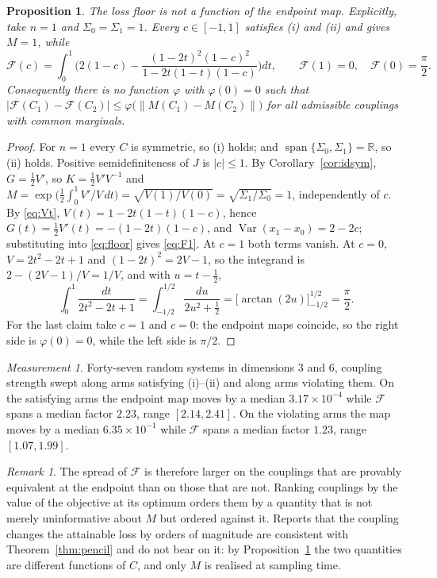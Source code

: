 \documentclass[11pt]{article}
\newtheorem{proposition}[lemma]{Proposition}
\theoremstyle{definition}
\theoremstyle{remark}
\newtheorem{remark}[lemma]{Remark}
\newtheorem{measurement}[lemma]{Measurement}
\DeclareMathOperator{\Var}{Var}
\DeclareMathOperator{\spn}{span}
\newcommand{\R}{\mathbb{R}}
\begin{document}
\begin{proposition}\label{prop:decouple}
The loss floor is not a function of the endpoint map. Explicitly, take $n=1$ and
$\Sigma_0=\Sigma_1=1$. Every $c\in[-1,1]$ satisfies \textup{(i)} and \textup{(ii)} and gives
$M=1$, while
\begin{equation}\label{eq:F1}
\mathcal F(c)=\int_0^1\Big(2(1-c)-\frac{(1-2t)^{2}(1-c)^{2}}{1-2t(1-t)(1-c)}\Big)dt,
\qquad
\mathcal F(1)=0,\quad \mathcal F(0)=\frac{\pi}{2}.
\end{equation}
Consequently there is no function $\varphi$ with $\varphi(0)=0$ such that
$|\mathcal F(C_1)-\mathcal F(C_2)|\le\varphi\big(\|M(C_1)-M(C_2)\|\big)$ for all admissible
couplings with common marginals.
\end{proposition}

\begin{proof}
For $n=1$ every $C$ is symmetric, so (i) holds; and $\spn\{\Sigma_0,\Sigma_1\}=\R$, so (ii)
holds. Positive semidefiniteness of $J$ is $|c|\le1$. By Corollary~\ref{cor:idsym},
$G=\tfrac12V'$, so $K=\tfrac12V'V^{-1}$ and
$M=\exp\big(\tfrac12\int_0^1V'/V\,dt\big)=\sqrt{V(1)/V(0)}=\sqrt{\Sigma_1/\Sigma_0}=1$,
independently of $c$. By \eqref{eq:Vt}, $V(t)=1-2t(1-t)(1-c)$, hence
$G(t)=\tfrac12V'(t)=-(1-2t)(1-c)$, and $\Var(x_1-x_0)=2-2c$; substituting into \eqref{eq:floor}
gives \eqref{eq:F1}. At $c=1$ both terms vanish. At $c=0$, $V=2t^{2}-2t+1$ and
$(1-2t)^{2}=2V-1$, so the integrand is $2-(2V-1)/V=1/V$, and with $u=t-\tfrac12$,
\[
\int_0^1\frac{dt}{2t^{2}-2t+1}=\int_{-1/2}^{1/2}\frac{du}{2u^{2}+\tfrac12}
=\Big[\arctan(2u)\Big]_{-1/2}^{1/2}=\frac{\pi}{2}.
\]
For the last claim take $c=1$ and $c=0$: the endpoint maps coincide, so the right side is
$\varphi(0)=0$, while the left side is $\pi/2$.
\end{proof}

\begin{measurement}\label{meas:decouple}
Forty-seven random systems in dimensions $3$ and $6$, coupling strength swept along arms
satisfying (i)--(ii) and along arms violating them. On the satisfying arms the endpoint map moves
by a median $3.17\times10^{-4}$ while $\mathcal F$ spans a median factor $2.23$, range
$[2.14,2.41]$. On the violating arms the map moves by a median $6.35\times10^{-1}$ while
$\mathcal F$ spans a median factor $1.23$, range $[1.07,1.99]$.
\end{measurement}

\begin{remark}\label{rem:floorread}
The spread of $\mathcal F$ is therefore larger on the couplings that are provably equivalent at
the endpoint than on those that are not. Ranking couplings by the value of the objective at its
optimum orders them by a quantity that is not merely uninformative about $M$ but ordered against
it. Reports that the coupling changes the attainable loss by orders of magnitude are consistent
with Theorem~\ref{thm:pencil} and do not bear on it: by Proposition~\ref{prop:decouple} the two
quantities are different functions of $C$, and only $M$ is realised at sampling time.
\end{remark}
\end{document}
